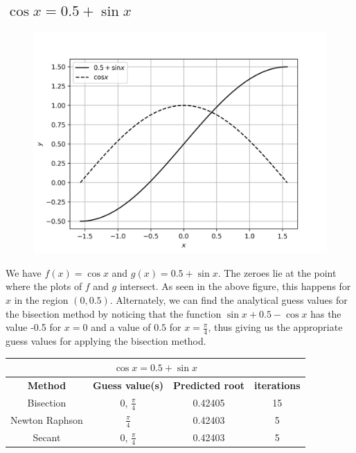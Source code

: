 \documentclass[12,a4paper]{article}
\begin{document}
    \subsection{$\cos x = 0.5 + \sin x$}
    \begin{figure}[H]
        \centering
        \includegraphics[width = \textwidth]{plots/p4.png}
        \label{fig:my_label}
    \end{figure}
    We have $f(x) = \cos x$ and $g(x) = 0.5 + \sin x$. The zeroes lie at the point where the plots of $f$ and $g$ intersect. As seen in the above figure, this happens for $x$ in the region $(0,0.5)$. Alternately, we can find the analytical guess values for the bisection method by noticing that the function $\sin x + 0.5 - \cos x$ has the value -0.5 for $x = 0$ and a value of $0.5$ for $x = \frac{\pi}{4}$, thus giving us the appropriate guess values for applying the bisection method.
    \begin{table}[h!]
        \centering
        \begin{tabular}{|c|c c c|} 
            \hline
            \multicolumn{4}{|c|}{$\cos x = 0.5 + \sin x$}\\
            \hline
            \textbf{Method}&\textbf{Guess value(s)}&\textbf{Predicted root}&\textbf{iterations} \\ [0.5ex] 
            \hline
            Bisection & 0, $\frac{\pi}{4}$ & 0.42405 & 15 \\ 
            Newton Raphson & $\frac{\pi}{4}$ & 0.42403 & 5 \\
            Secant & 0, $\frac{\pi}{4}$ & 0.42403 & 5 \\[1ex] 
            \hline
        \end{tabular}
    \end{table}
\end{document}
